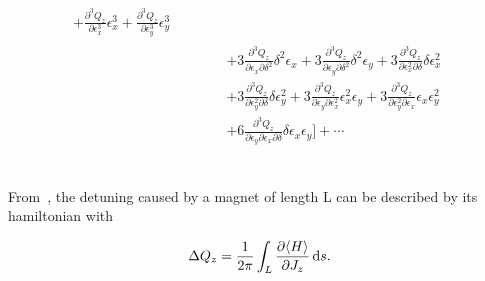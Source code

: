 \begin{equation}
\begin{aligned}
                                                  + \frac{\partial^{3} Q_z}{\partial \epsilon_{x}^{3}}  \epsilon_{x}^{3} 
                                                  + \frac{\partial^{3} Q_z}{\partial \epsilon_{y}^{3}}  \epsilon_{y}^{3} \\
                                             &\;\begin{aligned}
                                             \phantom{+ \frac{1}{3!} \biggl[} 
                                               &+ 3 \frac{\partial^{3} Q_z}{\partial \epsilon_{x}\partial \delta^{2}} \delta^{2} \epsilon_{x} 
                                                + 3  \frac{\partial^{3} Q_z}{\partial \epsilon_{y}\partial \delta^{2}}  \delta^{2} \epsilon_{y}
                                                + 3 \frac{\partial^{3} Q_z}{\partial \epsilon_{x}^{2}\partial \delta}  \delta \epsilon_{x}^{2} \\
                                               &+ 3 \frac{\partial^{3} Q_z}{\partial \epsilon_{y}^{2}\partial \delta} \delta \epsilon_{y}^{2}  
                                                + 3  \frac{\partial^{3} Q_z}{\partial \epsilon_{y}\partial \epsilon_{x}^{2}} \epsilon_{x}^{2} \epsilon_{y} 
                                                + 3 \frac{\partial^{3} Q_z}{\partial \epsilon_{y}^{2}\partial \epsilon_{x}} \epsilon_{x} \epsilon_{y}^{2} \\
                                               &+ 6 \frac{\partial^{3} Q_z}{\partial \epsilon_{y}\partial  \epsilon_{x}\partial \delta} \delta \epsilon_{x} \epsilon_{y} 
                                             \biggr] + \cdots \\
                                             \end{aligned}
\end{aligned}
\end{equation}




\subsection{}

From~\cite{dilly_derivation_2023}, the detuning caused by a magnet of length L can be described by
its hamiltonian with 

\begin{equation}
  \Delta Q_z = \frac{1}{2 \pi} \int_L \frac{\partial \langle H \rangle}{\partial J_z} \mathop{}\!\mathrm{d} s.
\end{equation}

